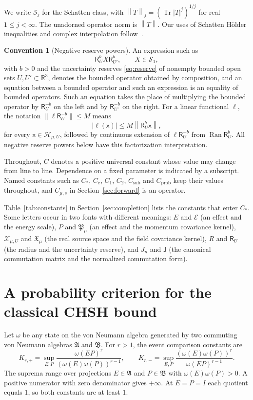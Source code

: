 \documentclass[11pt]{amsart}
\numberwithin{equation}{section}
\theoremstyle{definition}
\newtheorem{convention}[theorem]{Convention}
\newcommand{\A}{\mathfrak A}
\newcommand{\B}{\mathfrak B}
\newcommand{\R}{\mathbb R}
\newcommand{\Hh}{\mathcal H}
\newcommand{\Sc}{\mathcal S}
\newcommand{\Res}{\mathsf R}
\newcommand{\sx}{\mathsf x}
\newcommand{\Energy}{\mathcal E}
\newcommand{\Tr}{\operatorname{Tr}}
\newcommand{\Ran}{\operatorname{Ran}}
\newcommand{\norm}[1]{\left\|#1\right\|}
\begin{document}
We write \(\Sc_j\) for the Schatten class, with
\(\norm{T}_j=(\Tr|T|^j)^{1/j}\) for real \(1\le j<\infty\).
The unadorned operator norm is \(\norm{T}\).
Our uses of Schatten Hölder inequalities and complex interpolation
follow~\cite{Simon05}.

\begin{convention}[Negative reserve powers]\label{conv:factorization}
An expression such as
\[
 \Res_U^bX\Res_{U'}^b,\qquad X\in\Sc_1,
\]
with \(b>0\) and the uncertainty reserves \eqref{eq:reserve} of nonempty
bounded open sets \(U,U'\subset\R^3\), denotes the
bounded operator obtained by composition, and an equation between a
bounded operator and such an expression is an equality of bounded
operators. Such an equation takes the place of multiplying the bounded
operator by \(\Res_U^{-b}\) on the left and by \(\Res_{U'}^{-b}\) on the
right. For a linear functional
\(\ell\), the notation \(\lVert\ell\Res_U^{-b}\rVert\le M\) means
\[
 |\ell(\sx)|\le M\norm{\Res_U^b\sx},
\]
for every \(\sx\in\Hh_{\mu,U}\), followed by continuous extension of \(\ell\Res_U^{-b}\)
from \(\Ran\Res_U^b\). All negative
reserve powers below have this factorization interpretation.
\end{convention}

Throughout, \(C\) denotes a positive universal constant whose value may
change from line to line. Dependence on a fixed parameter is indicated
by a subscript. Named constants such as \(C_*\), \(C_c\), \(C_1\), \(C_2\),
\(C_{\mathrm{sub}}\) and \(C_{\mathrm{prob}}\) keep their values throughout, and
\(C_{\mu,s}\) in Section~\ref{sec:forward} is an operator.

Table~\ref{tab:constants} in Section~\ref{sec:completion} lists the
constants that enter \(C_*\). Some letters occur in two fonts with
different meanings: \(E\) and \(\Energy\) (an effect and the energy
scale), \(P\) and \(\mathfrak P_\mu\) (an effect and the momentum
covariance kernel), \(\mathcal X_{\mu,U}\) and \(\mathfrak X_\mu\) (the
real source space and the field covariance kernel), \(R\) and \(\Res_U\)
(the radius and the uncertainty reserve), and \(J_n\) and \(\mathsf J\)
(the canonical commutation matrix and the normalized commutation form).

\section{A probability criterion for the classical CHSH bound}
\label{sec:probability}

Let \(\omega\) be any state on the von Neumann algebra generated by two
commuting von Neumann algebras \(\A\) and \(\B\). For \(r>1\), the event comparison constants are
\begin{equation}
 K_{r,+}
 =\sup_{E,P}
 \frac{\omega(EP)^r}{(\omega(E)\omega(P))^{r-1}},
 \qquad
 K_{r,-}
 =\sup_{E,P}
 \frac{(\omega(E)\omega(P))^r}{\omega(EP)^{r-1}}.
 \label{eq:K}
\end{equation}
The suprema range over projections \(E\in\A\) and \(P\in\B\) with
\(\omega(E)\omega(P)>0\). A positive numerator with zero denominator gives
\(+\infty\). At \(E=P=I\) each quotient equals \(1\), so both
constants are at least \(1\).
\end{document}
